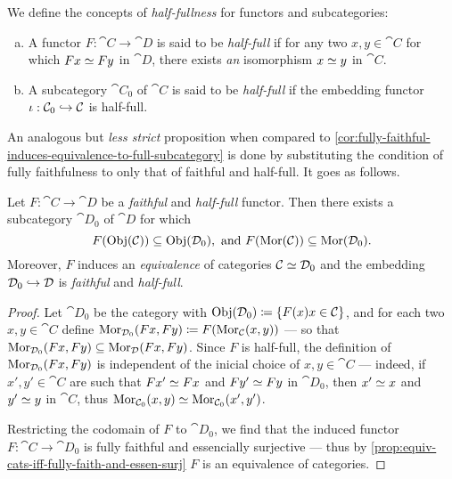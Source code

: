 \begin{definition}
\label{def:half-full}
We define the concepts of \emph{half-fullness} for functors and subcategories:
\begin{enumerate}[(a)]\setlength\itemsep{0em}
\item A functor \(F: \cat C \to \cat D\) is said to be \emph{half-full} if for
  any two \(x, y \in \cat C\) for which \(F x \simeq F y\) in \(\cat D\), there
  exists \emph{an} isomorphism \(x \simeq y\) in \(\cat C\).

\item A subcategory \(\cat C_0\) of \(\cat C\) is said to be \emph{half-full} if
  the embedding functor \(\iota: \mathcal C_0 \hookrightarrow \mathcal C\) is half-full.
\end{enumerate}
\end{definition}

An analogous but \emph{less strict} proposition when compared to
\cref{cor:fully-faithful-induces-equivalence-to-full-subcategory} is done by
substituting the condition of fully faithfulness to only that of faithful and
half-full. It goes as follows.

\begin{proposition}
\label{prop:faithful-half-full-induces-equivalence-to-subcategory}
Let \(F: \cat C \to \cat D\) be a \emph{faithful} and \emph{half-full}
functor. Then there exists a subcategory \(\cat D_0\) of \(\cat D\) for which
\[
F(\operatorname{Obj}(\mathcal C)) \subseteq \operatorname{Obj}(\mathcal D_0),
\text{ and }
F(\operatorname{Mor}(\mathcal C)) \subseteq \operatorname{Mor}(\mathcal D_0).
\]
Moreover, \(F\) induces an \emph{equivalence} of categories
\(\mathcal C \simeq \mathcal D_0\) and the embedding
\(\mathcal D_0 \hookrightarrow \mathcal D\) is \emph{faithful} and
\emph{half-full}.
\end{proposition}

\begin{proof}
Let \(\cat D_0\) be the category with
\(\operatorname{Obj}(\mathcal D_0) \coloneq \{F(x) \relax x \in \mathcal C\}\), and for each two
\(x, y \in \cat C\) define
\(\operatorname{Mor}_{\mathcal D_0}(F x, F y) \coloneq F(\operatorname{Mor}_{\mathcal C}(x, y))\) --- so that
\(\operatorname{Mor}_{\mathcal D_0}(F x, F y) \subseteq \operatorname{Mor}_{\mathcal D}(F x, F y)\). Since \(F\) is
half-full, the definition of \(\operatorname{Mor}_{\mathcal D_0}(F x, F y)\) is independent of the
inicial choice of \(x, y \in \cat C\) --- indeed, if \(x', y' \in \cat C\) are
such that \(F x' \simeq F x\) and \(F y' \simeq F y\) in \(\cat D_0\), then \(x'
\simeq x\) and \(y' \simeq y\) in \(\cat C\), thus \(\operatorname{Mor}_{\mathcal C_0}(x, y) \simeq
\operatorname{Mor}_{\mathcal C_0}(x', y')\).

Restricting the codomain of \(F\) to \(\cat D_0\), we find that the induced
functor \(F: \cat C \to \cat D_0\) is fully faithful and essencially surjective
--- thus by \cref{prop:equiv-cats-iff-fully-faith-and-essen-surj} \(F\) is an
equivalence of categories.
\end{proof}

